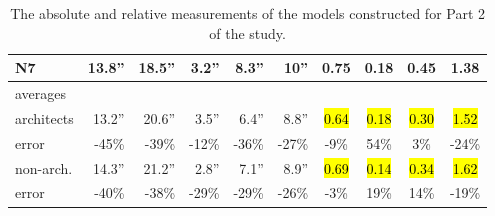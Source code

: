 \begin{table}[tbp]
\begin{center}
\begin{footnotesize}
\begin{tabular}{@{}l@{~~}|@{~~}r@{~~~}r@{~~~}r@{~~~}r@{~~~}r@{~~}|@{~~}c@{~~~}c@{~~~}c@{~~~}c@{}}
N7      &  13.8''  &  18.5''  &  3.2''  &  8.3''  &   10''  &  0.75    &  0.18    &  0.45  &  1.38 \\ \hline  
{\tiny averages } &          &          &         &         &         &          &          &        &\\
{\tiny architects } & 13.2'' & 20.6'' & 3.5''  &  6.4''  &   8.8'' &  \hl{0.64}    &  \hl{0.18}	  &  \hl{0.30}  &  \hl{1.52} \\
{\tiny error  } &     -45\% & -39\% & -12\% & -36\% & -27\% & -9\% & 54\% & 3\% & -24\% \\
{\tiny non-arch. }    & 14.3'' &	21.2'' & 2.8''	&  7.1''  &   8.9'' &  \hl{0.69}    &  \hl{0.14}	  &  \hl{0.34}  &  \hl{1.62} \\
{\tiny error  } &     -40\% & -38\% & -29\% & -29\% & -26\% & -3\% & 19\% & 14\% & -19\%
\end{tabular}
\end{footnotesize}
\end{center}
\vspace{-0.1in}
\caption{
\label{table:measurements}
The absolute and relative measurements of the
models constructed for Part 2 of the study.
}
\end{table}
